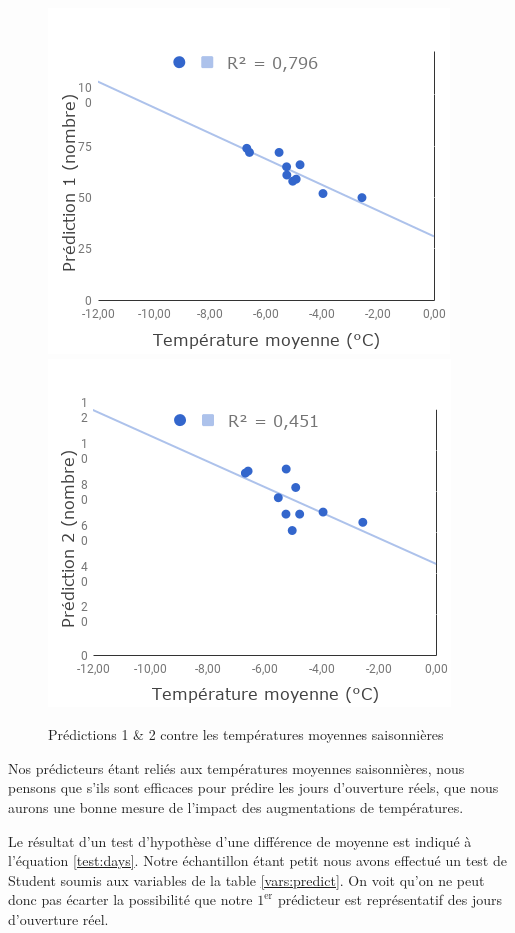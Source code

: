 \documentclass[12pt]{article}
\numberwithin{figure}{section}
\numberwithin{table}{section}
\begin{document}
\begin{figure}
    \centering
    \includegraphics[scale=0.5]{Prediction1.png}
    \includegraphics[scale=0.5]{Prediction2.png}
    \caption{Pr\'edictions 1 \& 2 contre les temp\'eratures moyennes saisonni\`eres}\label{predictions}
\end{figure}

Nos pr\'edicteurs \'etant reli\'es aux temp\'eratures moyennes saisonni\`eres, nous pensons que
s'ils sont efficaces pour pr\'edire les jours d'ouverture r\'eels, que nous aurons une bonne mesure
de l'impact des augmentations de temp\'eratures.

Le r\'esultat d'un test d'hypoth\`ese d'une diff\'erence de moyenne est indiqu\'e \`a l'\'equation
\eqref{test:days}. Notre \'echantillon \'etant petit nous avons effectu\'e un test de Student soumis
aux variables de la table \ref{vars:predict}. On voit qu'on ne peut donc pas \'ecarter la
possibilit\'e que notre $1^\text{er}$ pr\'edicteur est repr\'esentatif des jours d'ouverture r\'eel. 
\end{document}
